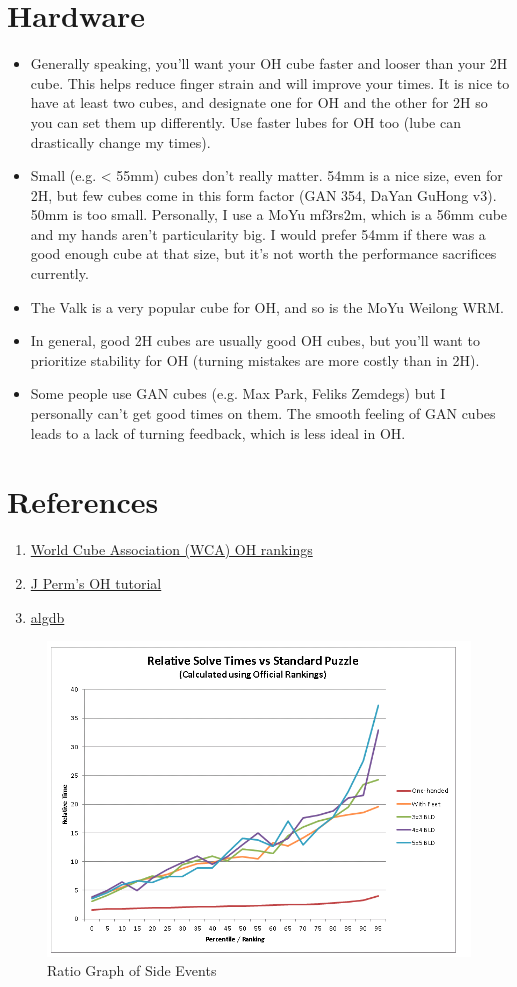 \documentclass[11pt, oneside]{article}
\begin{document}
\section{Hardware}
\begin{itemize}
  \item Generally speaking, you'll want your OH cube faster and looser than your
    2H cube. This helps reduce finger strain and will improve your times.
    It is nice to have at least two cubes, and designate one for OH and the
    other for 2H so you can set them up differently.
    Use faster lubes for OH too (lube can drastically change my times). 
  \item Small (e.g. < 55mm) cubes don't really matter. 54mm is a nice size,
    even for 2H, but few cubes come in this form factor
    (GAN 354, DaYan GuHong v3). 50mm is too small.
    Personally, I use a MoYu mf3rs2m, which is a 56mm cube and my hands aren't
    particularity big. I would prefer 54mm if there was a good enough cube
    at that size, but it's not worth the performance sacrifices currently. 
  \item The Valk is a very popular cube for OH, and so is the MoYu Weilong WRM. 
  \item In general, good 2H cubes are usually good OH cubes, but you'll want to
    prioritize stability for OH (turning mistakes are more costly than in 2H).
  \item Some people use GAN cubes (e.g. Max Park, Feliks Zemdegs)
    but I personally can't get good times on them. The smooth feeling of GAN
    cubes leads to a lack of turning feedback, which is less ideal in OH.
\end{itemize}


\section{References}
\begin{enumerate}
  \item \href{https://www.worldcubeassociation.org/results/rankings/333oh/average}
    {World Cube Association (WCA) OH rankings}
  \item \href{https://www.youtube.com/watch?v=mUF3aPDTO-4}{J Perm's OH tutorial}
  \item \href{http://algdb.net/}{algdb}
\end{enumerate}

\begin{figure}[h!]
  \centering
  \includegraphics[scale=0.6]{ratio_graph}
  \caption{Ratio Graph of Side Events}
\end{figure}
\end{document}
